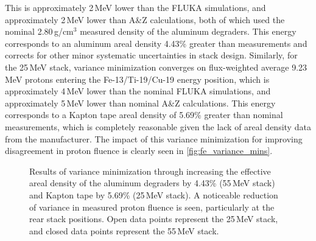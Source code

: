 This is approximately 2\,MeV lower than the 
FLUKA simulations, and approximately 2\,MeV lower than 
A\&Z calculations, both of which used the nominal 2.80\,g/cm$^3$ measured density of the  aluminum degraders.
This energy corresponds to an aluminum areal density  4.43\% greater than 
measurements and 
corrects for other minor systematic uncertainties in stack design.
Similarly, for the 25\,MeV stack, variance minimization converges on  flux-weighted average 9.23\,MeV protons entering the Fe-13/Ti-19/Cu-19 energy position, which is approximately 4\,MeV lower than the nominal FLUKA simulations, and approximately 5\,MeV lower than nominal A\&Z calculations.
This energy corresponds to a Kapton tape areal density of 5.69\% greater than nominal measurements, which is completely reasonable given the lack of areal density data from the manufacturer.
The impact of this variance minimization for improving disagreement in proton fluence is  clearly  seen in   \autoref{fig:fe_variance_mins}.




\begin{figure}
    \centering
    \caption{Results of variance minimization through increasing the effective areal density of the  aluminum degraders by 4.43\% (55\,MeV stack) and Kapton tape by 5.69\% (25\,MeV stack). A noticeable reduction of variance in measured proton fluence is seen,  particularly at the  rear stack positions.  Open data points represent the 25\,MeV stack, and closed data points represent the 55\,MeV stack.} 
     \label{fig:fe_variance_mins}
\end{figure}



